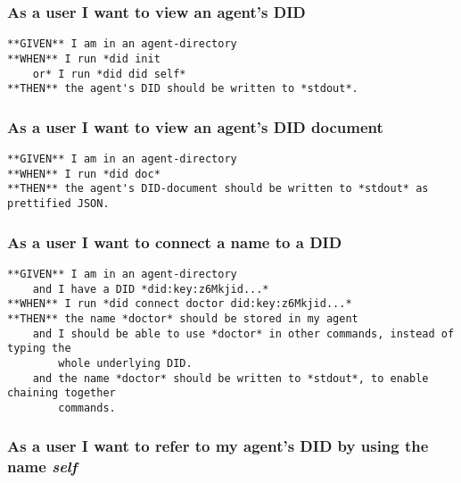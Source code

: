\hypertarget{as-a-user-i-want-to-view-an-agents-did}{%
\subsubsection{As a user I want to view an agent's
DID}\label{as-a-user-i-want-to-view-an-agents-did}}

\begin{lstlisting}
**GIVEN** I am in an agent-directory
**WHEN** I run *did init
    or* I run *did did self*
**THEN** the agent's DID should be written to *stdout*.
\end{lstlisting}

\hypertarget{as-a-user-i-want-to-view-an-agents-did-document}{%
\subsubsection{As a user I want to view an agent's DID
document}\label{as-a-user-i-want-to-view-an-agents-did-document}}

\begin{lstlisting}
**GIVEN** I am in an agent-directory
**WHEN** I run *did doc*
**THEN** the agent's DID-document should be written to *stdout* as prettified JSON.
\end{lstlisting}

\hypertarget{as-a-user-i-want-to-connect-a-name-to-a-did}{%
\subsubsection{As a user I want to connect a name to a
DID}\label{as-a-user-i-want-to-connect-a-name-to-a-did}}

\begin{lstlisting}
**GIVEN** I am in an agent-directory
    and I have a DID *did:key:z6Mkjid...*
**WHEN** I run *did connect doctor did:key:z6Mkjid...*
**THEN** the name *doctor* should be stored in my agent
    and I should be able to use *doctor* in other commands, instead of typing the 
        whole underlying DID.
    and the name *doctor* should be written to *stdout*, to enable chaining together 
        commands.
\end{lstlisting}

\hypertarget{as-a-user-i-want-to-refer-to-my-agents-did-by-using-the-name-self}{%
\subsubsection{\texorpdfstring{As a user I want to refer to my agent's
DID by using the name
\emph{self}}{As a user I want to refer to my agent's DID by using the name self}}\label{as-a-user-i-want-to-refer-to-my-agents-did-by-using-the-name-self}}

